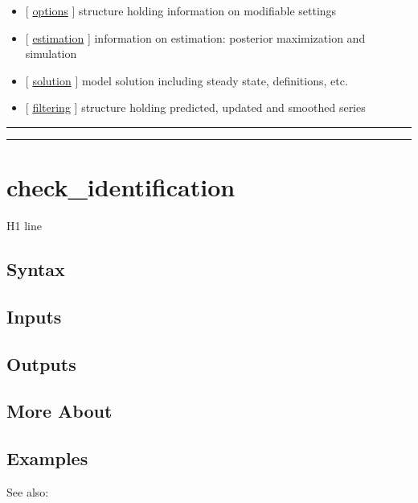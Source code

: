 \documentclass[letterpaper,10pt,english]{sphinxmanual}
\begin{document}
\begin{itemize}
\item {} 
{[} {\hyperref[classes/models/@rfvar/rfvar:options]{options}} {]}   structure holding information on modifiable settings

\item {} 
{[} {\hyperref[classes/models/@rfvar/rfvar:estimation]{estimation}} {]}   information on estimation: posterior maximization and simulation

\item {} 
{[} {\hyperref[classes/models/@rfvar/rfvar:solution]{solution}} {]}   model solution including steady state, definitions, etc.

\item {} 
{[} {\hyperref[classes/models/@rfvar/rfvar:filtering]{filtering}} {]}   structure holding predicted, updated and smoothed series

\end{itemize}


\bigskip\hrule{}\bigskip



\bigskip\hrule{}\bigskip



\section{check\_identification}
\label{classes/models/@rfvar/rfvar:id1}\label{classes/models/@rfvar/rfvar:check-identification}
H1 line


\subsection{Syntax}
\label{classes/models/@rfvar/rfvar:syntax}

\subsection{Inputs}
\label{classes/models/@rfvar/rfvar:inputs}

\subsection{Outputs}
\label{classes/models/@rfvar/rfvar:outputs}

\subsection{More About}
\label{classes/models/@rfvar/rfvar:more-about}

\subsection{Examples}
\label{classes/models/@rfvar/rfvar:examples}
See also:
\end{document}
